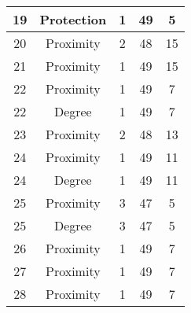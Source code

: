 \documentclass[results.tex]{subfiles}
\begin{document}
\begin{center}
\begin{tabular}{| c || c | c | c | c |}
            \hline
            19                      & Protection                   & 1                      & 49                      & 5                    \\
            \hline
            20                      & Proximity                    & 2                      & 48                      & 15                   \\
            \hline
            21                      & Proximity                    & 1                      & 49                      & 15                   \\
            \hline
            22                      & Proximity                    & 1                      & 49                      & 7                    \\
            \hline
            22                      & Degree                       & 1                      & 49                      & 7                    \\
            \hline
            23                      & Proximity                    & 2                      & 48                      & 13                   \\
            \hline
            24                      & Proximity                    & 1                      & 49                      & 11                   \\
            \hline
            24                      & Degree                       & 1                      & 49                      & 11                   \\
            \hline
            25                      & Proximity                    & 3                      & 47                      & 5                    \\
            \hline
            25                      & Degree                       & 3                      & 47                      & 5                    \\
            \hline
            26                      & Proximity                    & 1                      & 49                      & 7                    \\
            \hline
            27                      & Proximity                    & 1                      & 49                      & 7                    \\
            \hline
            28                      & Proximity                    & 1                      & 49                      & 7                    \\

\end{tabular}
\end{center}
\end{document}
